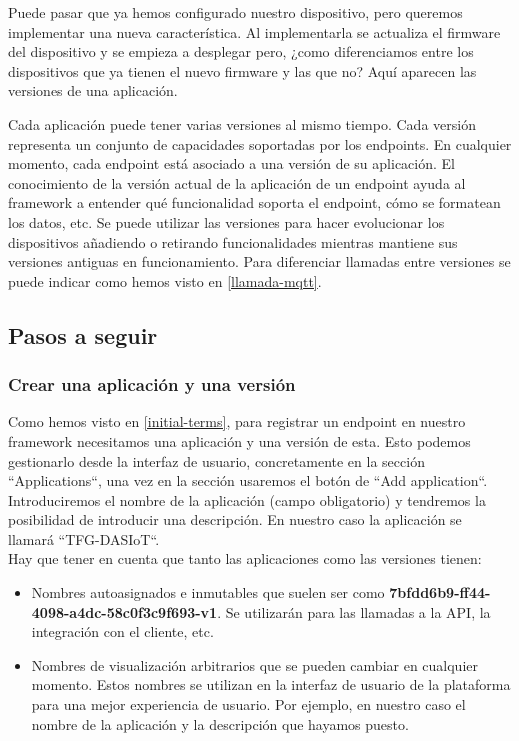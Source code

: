 Puede pasar que ya hemos configurado nuestro dispositivo, pero queremos implementar una nueva característica. Al implementarla se actualiza el firmware del dispositivo y se empieza a desplegar pero, ¿como diferenciamos entre los dispositivos que ya tienen el nuevo firmware y las que no? Aquí aparecen las versiones de una aplicación.

Cada aplicación puede tener varias versiones al mismo tiempo. Cada versión representa un conjunto de capacidades soportadas por los endpoints. En cualquier momento, cada endpoint está asociado a una versión de su aplicación. El conocimiento de la versión actual de la aplicación de un endpoint ayuda al framework a entender qué funcionalidad soporta el endpoint, cómo se formatean los datos, etc. Se puede utilizar las versiones para hacer evolucionar los dispositivos añadiendo o retirando funcionalidades mientras mantiene sus versiones antiguas en funcionamiento. Para diferenciar llamadas entre versiones se puede indicar como hemos visto en \ref{llamada-mqtt}.

\subsection{Pasos a seguir}

\subsubsection{Crear una aplicación y una versión}

Como hemos visto en \ref{initial-terms}, para registrar un endpoint en nuestro framework necesitamos una aplicación y una versión de esta. Esto podemos gestionarlo desde la interfaz de usuario, concretamente en la sección ``Applications``, una vez en la sección usaremos el botón de ``Add application``. Introduciremos el nombre de la aplicación (campo obligatorio) y tendremos la posibilidad de introducir una descripción. En nuestro caso la aplicación se llamará ``TFG-DASIoT``. \\

Hay que tener en cuenta que tanto las aplicaciones como las versiones tienen:

\begin{itemize}
    \item Nombres autoasignados e inmutables que suelen ser como  \textbf{7bfdd6b9-ff44-4098-a4dc-58c0f3c9f693-v1}. Se utilizarán para las llamadas a la API, la integración con el cliente, etc.
    \item Nombres de visualización arbitrarios que se pueden cambiar en cualquier momento. Estos nombres se utilizan en la interfaz de usuario de la plataforma para una mejor experiencia de usuario. Por ejemplo, en nuestro caso el nombre de la aplicación y la descripción que hayamos puesto.
\end{itemize}


